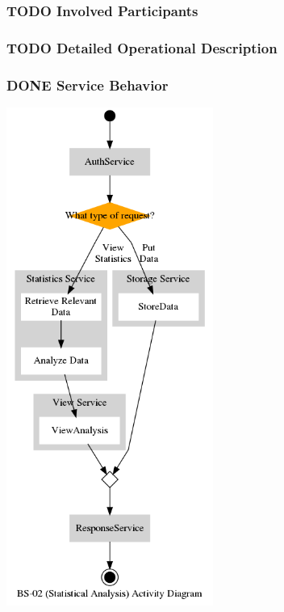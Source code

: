 \documentclass[11pt]{article}
\begin{document}
\subsubsection{{\bfseries\sffamily TODO} Involved Participants}
\label{sec:org7de842b}
\subsubsection{{\bfseries\sffamily TODO} Detailed Operational Description}
\label{sec:org54249c4}
\subsubsection{{\bfseries\sffamily DONE} Service Behavior}
\label{sec:org83471c5}
\begin{center}
\includegraphics[height=16.3cm]{res/bs_02_act.png}
\end{center}
\end{document}
